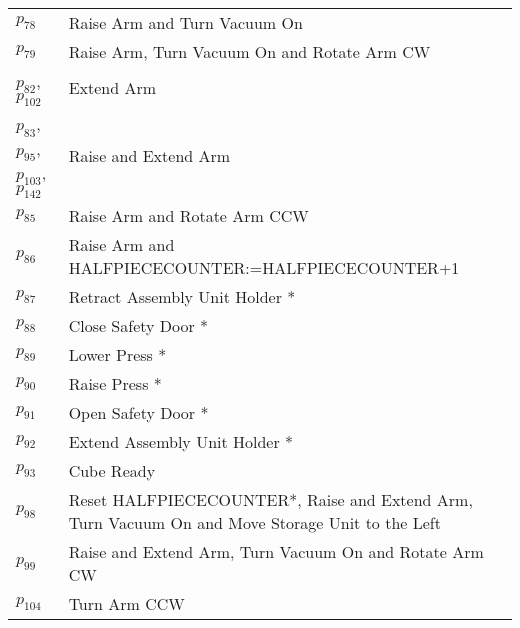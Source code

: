 \begin{longtable}{M{5cm}M{10cm}}
\hyperlink{completeNet:p78}{\hypertarget{completeTable:p78}{$p_{78}$}} & Raise Arm and Turn Vacuum On\\
\hyperlink{completeNet:p79}{\hypertarget{completeTable:p79}{$p_{79}$}} & Raise Arm, Turn Vacuum On and Rotate Arm CW\\
\hyperlink{completeNet:p82}{\hypertarget{completeTable:p82}{$p_{82}$}}, \hyperlink{completeNet:p102}{\hypertarget{completeTable:p102}{$p_{102}$}} & Extend Arm\\
\hyperlink{completeNet:p83}{\hypertarget{completeTable:p83}{$p_{83}$}}, \hyperlink{completeNet:p95}{\hypertarget{completeTable:p95}{$p_{95}$}}, \hyperlink{completeNet:p103}{\hypertarget{completeTable:p103}{$p_{103}$}}, \hyperlink{completeNet:p142}{\hypertarget{completeTable:p142}{$p_{142}$}} & Raise and Extend Arm\\
\hyperlink{completeNet:p85}{\hypertarget{completeTable:p85}{$p_{85}$}} & Raise Arm and Rotate Arm CCW\\
\hyperlink{completeNet:p86}{\hypertarget{completeTable:p86}{$p_{86}$}} & Raise Arm and HALFPIECECOUNTER:=HALFPIECECOUNTER+1\\
\hyperlink{completeNet:p87}{\hypertarget{completeTable:p87}{$p_{87}$}} & Retract Assembly Unit Holder *\\
\hyperlink{completeNet:p88}{\hypertarget{completeTable:p88}{$p_{88}$}} & Close Safety Door *\\
\hyperlink{completeNet:p89}{\hypertarget{completeTable:p89}{$p_{89}$}} & Lower Press *\\
\hyperlink{completeNet:p90}{\hypertarget{completeTable:p90}{$p_{90}$}} & Raise Press *\\
\hyperlink{completeNet:p91}{\hypertarget{completeTable:p91}{$p_{91}$}} & Open Safety Door *\\
\hyperlink{completeNet:p92}{\hypertarget{completeTable:p92}{$p_{92}$}} & Extend Assembly Unit Holder *\\
\hyperlink{completeNet:p93}{\hypertarget{completeTable:p93}{$p_{93}$}} & Cube Ready\\
\hyperlink{completeNet:p98}{\hypertarget{completeTable:p98}{$p_{98}$}} & Reset HALFPIECECOUNTER*, Raise and Extend Arm, Turn Vacuum On and Move Storage Unit to the Left\\
\hyperlink{completeNet:p99}{\hypertarget{completeTable:p99}{$p_{99}$}} & Raise and Extend Arm, Turn Vacuum On and Rotate Arm CW\\
\hyperlink{completeNet:p104}{\hypertarget{completeTable:p104}{$p_{104}$}} & Turn Arm CCW\\

\end{longtable}
